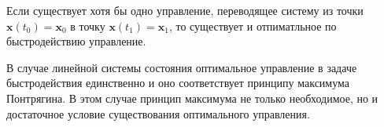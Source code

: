 \begin{theorem}
  Если существует хотя бы одно управление, переводящее систему из точки
  $\mathbf{x}(t_0) = \mathbf{x}_0$ в точку $\mathbf{x}(t_1) = \mathbf{x}_1$, то существует и
  отпиматльное по быстродействию управление.

  В случае линейной системы состояния оптимальное управление в задаче
  быстродействия единственно и оно соответствует принципу максимума Понтрягина. В
  этом случае принцип максимума не только необходимое, но и достаточное условие
  существования оптимального управления.
\end{theorem}
